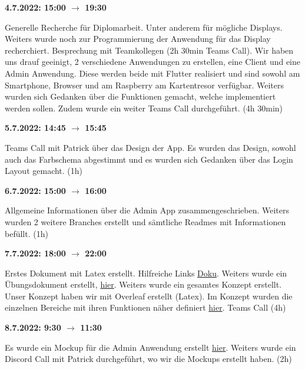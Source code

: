 \textbf{4.7.2022: 15:00 $\rightarrow$ 19:30} \

Generelle Recherche für Diplomarbeit. Unter anderem für mögliche Displays. Weiters wurde noch zur Programmierung der Anwendung für das Display recherchiert. Besprechung mit Teamkollegen (2h 30min Teams Call). Wir haben uns drauf geeinigt, 2 verschiedene Anwendungen zu erstellen, eine Client und eine Admin Anwendung. Diese werden beide mit Flutter realisiert und sind sowohl am Smartphone, Browser und am Raspberry am Kartentresor verfügbar. Weiters wurden sich Gedanken über die Funktionen gemacht, welche implementiert werden sollen. Zudem wurde ein weiter Teams Call durchgeführt. (4h 30min) 

\vspace{0.5cm}

\textbf{5.7.2022: 14:45 $\rightarrow$ 15:45} \

Teams Call mit Patrick über das Design der App. Es wurden das Design, sowohl auch das Farbschema abgestimmt und es wurden sich Gedanken über das Login Layout gemacht. (1h)

\vspace{0.5cm}

\textbf{6.7.2022: 15:00 $\rightarrow$ 16:00} \

Allgemeine Informationen über die Admin App zusammengeschrieben. Weiters wurden 2 weitere Branches erstellt und sämtliche Readmes mit Informationen befüllt. (1h)

\vspace{0.5cm}

\textbf{7.7.2022: 18:00 $\rightarrow$ 22:00} \

Erstes Dokument mit Latex erstellt. Hilfreiche Links \href{https://www.overleaf.com/learn/latex/Line_breaks_and_blank_spaces#Page_breaks}{Doku}. Weiters wurde ein
Übungsdokument erstellt, \href{https://www.overleaf.com/project/62c5bdaad31d926d54df41dd}{hier}. Weiters wurde ein gesamtes Konzept erstellt. Unser Konzept haben wir mit Overleaf erstellt (Latex). Im Konzept wurden die einzelnen Bereiche mit ihren Funktionen näher definiert \href{https://www.overleaf.com/project/62b5849dc59dc86e3368e022}{hier}. Teams Call (4h)

\vspace{0.5cm}

\textbf{8.7.2022: 9:30 $\rightarrow$ 11:30} \

Es wurde ein Mockup für die Admin Anwendung erstellt \href{https://github.com/litec-thesis/2223-thesis-5abhit-zoecbe_mayrjo_grupa-cardstorage/blob/main/doc/Mockups/admin_login_mockup.pdf}{hier}. Weiters wurde ein Discord Call mit Patrick durchgeführt, wo wir die Mockups erstellt haben. (2h)

